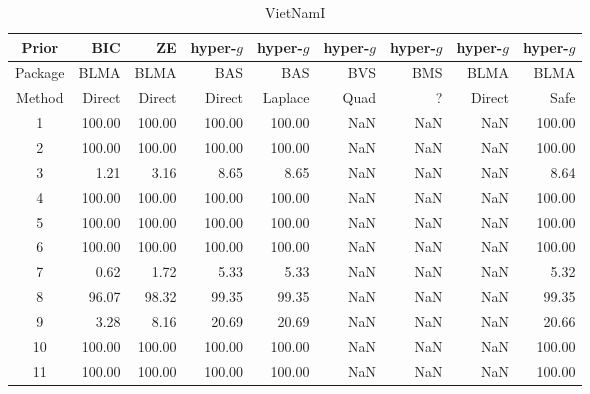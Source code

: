 \documentclass{article}[12pt]
\begin{document}
\begin{table}[ht]
	\centering
	\begin{tabular}{c|r|r|rrrrrr}
		Prior   & BIC    & ZE     & hyper-$g$ & hyper-$g$ & hyper-$g$  & hyper-$g$ & hyper-$g$ & hyper-$g$ \\
		\hline 
		Package & BLMA   & BLMA   & BAS       & BAS       & BVS        & BMS       & BLMA      & BLMA       \\
		\hline 
		Method  & Direct & Direct & Direct    & Laplace   & Quad & ?         & Direct    & Safe      \\ 
		\hline
		1 & 100.00 & 100.00 & 100.00 & 100.00 & NaN & NaN  & NaN & 100.00 \\ 
		2 & 100.00 & 100.00 & 100.00 & 100.00 & NaN & NaN & NaN  & 100.00 \\ 
		3 & 1.21   & 3.16   & 8.65   & 8.65   & NaN & NaN & NaN   & 8.64 \\ 
		4 & 100.00 & 100.00 & 100.00 & 100.00 & NaN & NaN & NaN & 100.00 \\ 
		5 & 100.00 & 100.00 & 100.00 & 100.00 & NaN & NaN & NaN & 100.00 \\ 
		6 & 100.00 & 100.00 & 100.00 & 100.00 & NaN & NaN & NaN & 100.00 \\ 
		7 & 0.62   & 1.72   & 5.33   & 5.33   & NaN & NaN & NaN & 5.32 \\ 
		8 & 96.07  & 98.32  & 99.35  & 99.35  & NaN & NaN & NaN & 99.35 \\ 
		9 & 3.28    & 8.16  & 20.69  & 20.69  & NaN & NaN & NaN & 20.66 \\ 
		10 & 100.00 & 100.00 & 100.00 & 100.00 & NaN & NaN & NaN & 100.00 \\ 
		11 & 100.00 & 100.00 & 100.00 & 100.00 & NaN & NaN & NaN & 100.00 \\ 
		\hline
	\end{tabular}
	\caption{VietNamI}
	\label{tab:VietNamIResults1}
\end{table}
\end{document}
